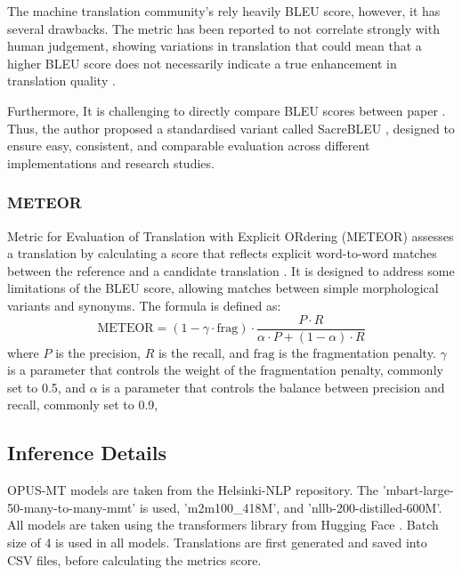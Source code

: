 \documentclass[a4paper]{article}
\begin{document}
The machine translation community's rely heavily BLEU score, however, it has several drawbacks. The metric has been reported to not correlate strongly with human judgement, showing variations in translation that could mean that a higher BLEU score does not necessarily indicate a true enhancement in translation quality \cite{callison-burch-2006-reevaluating-bleu}.

Furthermore, It is challenging to directly compare BLEU scores between paper \cite{post-2018-sacrebleu}. Thus, the author proposed a standardised variant called SacreBLEU \cite{post-2018-sacrebleu}, designed to ensure easy, consistent, and comparable evaluation across different implementations and research studies.

\subsubsection{METEOR}

Metric for Evaluation of Translation with Explicit ORdering (METEOR) \cite{lavie-2007-meteor} assesses a translation by calculating a score that reflects explicit word-to-word matches between the reference and a candidate translation \cite{agarwal-2008-meteor-mbleu-mter}. It is designed to address some limitations of the BLEU score, allowing matches between simple morphological variants and synonyms. The formula is defined as:
\begin{equation}
    \text{METEOR} = (1 - \gamma \cdot \text{frag}) \cdot \frac{P \cdot R}{\alpha \cdot P + (1 - \alpha) \cdot R}
\end{equation}
where \(P\) is the precision, \(R\) is the recall, and \(\text{frag}\) is the fragmentation penalty. \(\gamma\) is a parameter that controls the weight of the fragmentation penalty, commonly set to 0.5, and \(\alpha\) is a parameter that controls the balance between precision and recall, commonly set to 0.9,

\subsection{Inference Details}

OPUS-MT models are taken from the Helsinki-NLP repository. The 'mbart-large-50-many-to-many-mmt' is used, 'm2m100\_418M', and 'nllb-200-distilled-600M'. All models are taken using the transformers \cite{wolf-etal-2020-transformers} library from Hugging Face \cite{huggingface}. Batch size of 4 is used in all models. Translations are first generated and saved into CSV files, before calculating the metrics score.
\end{document}
